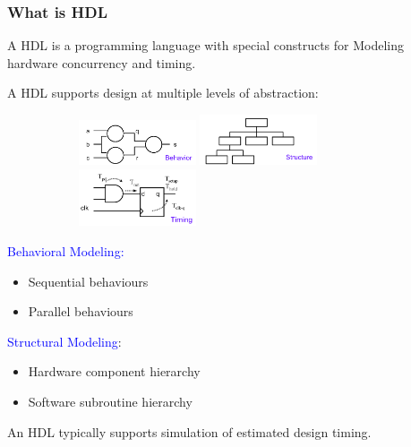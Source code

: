\documentclass[t]{beamer}
\begin{document}
\begin{frame}
\frametitle{What is HDL}

A HDL is a programming language with special constructs for Modeling hardware concurrency and timing.
\newline

A HDL supports design at multiple levels of abstraction:
\begin{figure}
  \begin{figure}[H!]
    \includegraphics[width=0.38\textwidth]{img/01_beh.png}
    \includegraphics[width=0.38\textwidth]{img/01_struct.png}
    \includegraphics[width=0.38\textwidth]{img/01_tim.png}
  \end{figure}
\end{figure}
\textcolor{blue}{Behavioral Modeling:}
\begin{itemize}
\item Sequential behaviours
\item Parallel behaviours
\end{itemize}

\textcolor{blue}{Structural Modeling}:
\begin{itemize}
\item Hardware component hierarchy
\item Software subroutine hierarchy
\end{itemize}

An HDL typically supports simulation of estimated design timing.
\end{frame}
\end{document}
